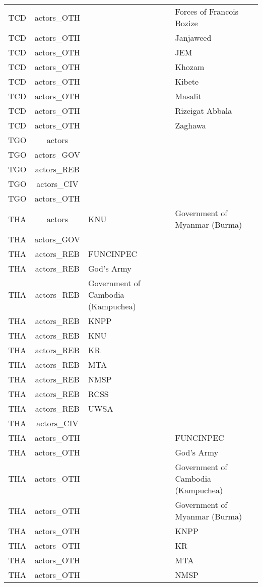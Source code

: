 \documentclass[12pt]{article}
\begin{document}
\begin{center}
\begin{longtable}{|c|c|p{7cm}|p{7cm}|}
  TCD & actors\_OTH &  & Forces of Francois Bozize \\ 
  TCD & actors\_OTH &  & Janjaweed \\ 
  TCD & actors\_OTH &  & JEM \\ 
  TCD & actors\_OTH &  & Khozam \\ 
  TCD & actors\_OTH &  & Kibete \\ 
  TCD & actors\_OTH &  & Masalit \\ 
  TCD & actors\_OTH &  & Rizeigat Abbala \\ 
  TCD & actors\_OTH &  & Zaghawa \\ 
  TGO & actors &  &  \\ 
  TGO & actors\_GOV &  &  \\ 
  TGO & actors\_REB &  &  \\ 
  TGO & actors\_CIV &  &  \\ 
  TGO & actors\_OTH &  &  \\ 
  THA & actors & KNU & Government of Myanmar (Burma) \\ 
  THA & actors\_GOV &  &  \\ 
  THA & actors\_REB & FUNCINPEC &  \\ 
  THA & actors\_REB & God's Army &  \\ 
  THA & actors\_REB & Government of Cambodia (Kampuchea) &  \\ 
  THA & actors\_REB & KNPP &  \\ 
  THA & actors\_REB & KNU &  \\ 
  THA & actors\_REB & KR &  \\ 
  THA & actors\_REB & MTA &  \\ 
  THA & actors\_REB & NMSP &  \\ 
  THA & actors\_REB & RCSS &  \\ 
  THA & actors\_REB & UWSA &  \\ 
  THA & actors\_CIV &  &  \\ 
  THA & actors\_OTH &  & FUNCINPEC \\ 
  THA & actors\_OTH &  & God's Army \\ 
  THA & actors\_OTH &  & Government of Cambodia (Kampuchea) \\ 
  THA & actors\_OTH &  & Government of Myanmar (Burma) \\ 
  THA & actors\_OTH &  & KNPP \\ 
  THA & actors\_OTH &  & KR \\ 
  THA & actors\_OTH &  & MTA \\ 
  THA & actors\_OTH &  & NMSP \\ 

\end{longtable}
\end{center}
\end{document}
